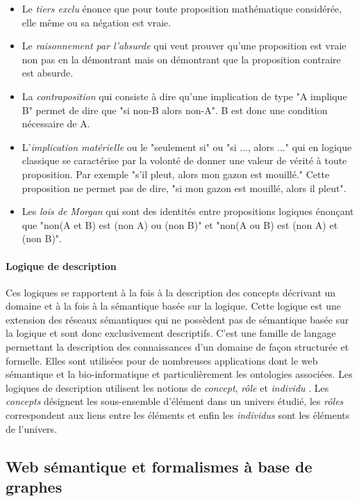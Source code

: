 \begin{itemize}
	\item Le \textit{tiers exclu} énonce que pour toute proposition mathématique considérée, elle même ou sa négation est vraie.
	\item Le \textit{raisonnement par l'absurde} qui veut prouver qu'une proposition est vraie non pas en la démontrant mais on démontrant que la proposition contraire est absurde.
	\item La \textit{contraposition} qui consiste à dire qu'une implication de type "A implique B" permet de dire que "si non-B alors non-A". B est donc une condition nécessaire de A.
	\item L'\textit{implication matérielle} ou le "seulement si" ou "si ..., alors ..." qui en logique classique se caractérise par la volonté de donner une valeur de vérité à toute proposition. Par exemple "s'il pleut, alors mon gazon est mouillé." Cette proposition ne permet pas de dire, "si mon gazon est mouillé, alors il pleut".
	\item Les \textit{lois de Morgan} qui sont des identités entre propositions logiques énonçant que "non(A et B) est (non A) ou (non B)" et "non(A ou B) est (non A) et (non B)".
\end{itemize}


\paragraph{Logique de description}

Ces logiques se rapportent à la fois à la description des concepts décrivant un domaine et à la fois à la sémantique basée sur la logique. Cette logique est une extension des réseaux sémantiques qui ne possèdent pas de sémantique basée sur la logique et sont donc exclusivement descriptifs. C'est une famille de langage permettant la description des connaissances d'un domaine de façon structurée et formelle. Elles sont utilisées pour de nombreuses applications dont le web sémantique et la bio-informatique et particulièrement les ontologies associées.
Les logiques de description utilisent les notions de \textit{concept}, \textit{rôle} et \textit{individu} \cite{baader2003description}. Les \textit{concepts} désignent les sous-ensemble d'élément dans un univers étudié, les \textit{rôles} correspondent aux liens entre les éléments et enfin les \textit{individus} sont les éléments de l'univers.


\subsection{Web sémantique et formalismes à base de graphes}

